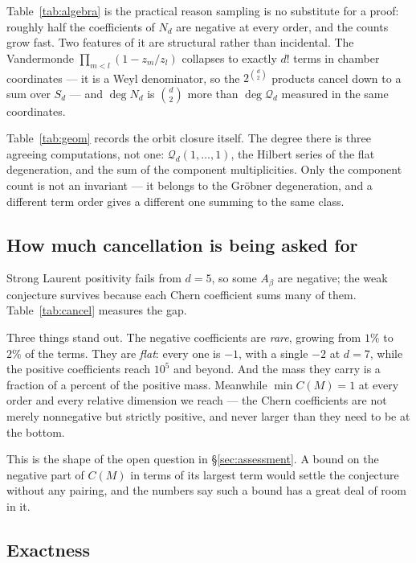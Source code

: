 \documentclass[11pt,a4paper]{article}
\newcommand{\Qd}{\mathcal{Q}}
\theoremstyle{plain}
\theoremstyle{definition}
\theoremstyle{remark}
\begin{document}
Table~\ref{tab:algebra} is the practical reason sampling is no substitute for a proof: roughly
half the coefficients of $N_d$ are negative at every order, and the counts grow fast. Two features
of it are structural rather than incidental. The Vandermonde $\prod_{m<l}(1 - z_m/z_l)$ collapses
to exactly $d!$ terms in chamber coordinates --- it is a Weyl denominator, so the $2^{\binom{d}{2}}$
products cancel down to a sum over $S_d$ --- and $\deg N_d$ is $\binom{d}{2}$ more than
$\deg \Qd_d$ measured in the same coordinates.



Table~\ref{tab:geom} records the orbit closure itself. The degree there is three agreeing
computations, not one: $\Qd_d(1,\dots,1)$, the Hilbert series of the flat degeneration, and the sum
of the component multiplicities. Only the component count is not an invariant --- it belongs to the
Gr\"obner degeneration, and a different term order gives a different one summing to the same class.



\subsection{How much cancellation is being asked for}

Strong Laurent positivity fails from $d = 5$, so some $A_\beta$ are negative; the weak conjecture
survives because each Chern coefficient sums many of them. Table~\ref{tab:cancel} measures the gap.



Three things stand out. The negative coefficients are \emph{rare}, growing from $1\%$ to $2\%$ of
the terms. They are \emph{flat}: every one is $-1$, with a single $-2$ at $d = 7$, while the
positive coefficients reach $10^5$ and beyond. And the mass they carry is a fraction of a percent
of the positive mass. Meanwhile $\min C(M) = 1$ at every order and every relative dimension we
reach --- the Chern coefficients are not merely nonnegative but strictly positive, and never
larger than they need to be at the bottom.

This is the shape of the open question in \S\ref{sec:assessment}. A bound on the negative part of
$C(M)$ in terms of its largest term would settle the conjecture without any pairing, and the
numbers say such a bound has a great deal of room in it.

\subsection{Exactness}
\end{document}
